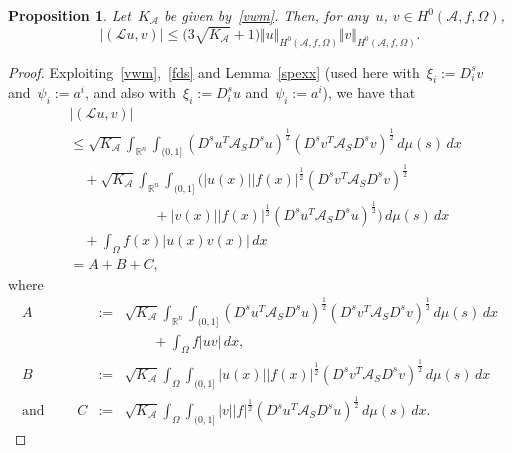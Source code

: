 \documentclass[11pt,hyp,]{nyjm}
\numberwithin{equation}{section}
\newcommand{\R}{\mathbb{R}}
\newtheorem{proposition}[theorem]{Proposition}
\theoremstyle{remark}
\newcommand{\ml}{\mathcal{L}}
\newcommand{\am}{\mathcal{A}}
\renewcommand{\leq}{\leqslant}
\begin{document}
			\begin{proposition}\label{ghighi}
				Let~$K_{\am}$ be given by~\eqref{vwm}. Then, for any~$u$, $v \in H^0(\mathcal{A}, f, \Omega)$,
				\[|(\ml u, v ) | \leq \big(3 \sqrt{K_{\am}}+1\big) \Vert u \Vert_{H^0(\mathcal{A}, f, \Omega)} \Vert v \Vert_{H^0(\mathcal{A}, f, \Omega)}.\]        
			\end{proposition}

			\begin{proof}
Exploiting~\eqref{vwm},~\eqref{fds} and Lemma~\ref{spexx}
(used here with~$\xi_i:=D^s_i v$ and~$\psi_i:=a^i$, and also with~$\xi_i:=D^s_i u$ and~$\psi_i:=a^i$), we have that
				\begin{align*}&
					|(\ml u, v)| \\&\leq \sqrt{K_{\am}} \int_{\R^n} \int_{(0,1]} (D^su^T \mathcal{A}_S D^su)^{\frac{1}{2}} (D^sv^T \mathcal{A}_S D^sv)^{\frac{1}{2}} \, d\mu(s) \, dx \\ &\quad + \sqrt{K_{\am} }\int_{\R^n} \int_{(0,1]}\Big(
|u(x)| |f(x)|^{\frac{1}{2}} (D^sv^T \mathcal{A}_S D^sv)^{\frac{1}{2}} \\&\qquad\qquad\qquad+ |v(x)| |f(x)|^{\frac{1}{2}} (D^su^T \mathcal{A}_S D^su)^{\frac{1}{2}} \Big)\, d\mu(s) \, dx \\ &\quad +  \int_{\Omega}f(x) |u(x) v(x)| \, dx \\ &=A + B + C,
\end{align*}	
where
\begin{eqnarray*}
A&:=& \sqrt{K_{\am}}  \displaystyle\int_{\R^n}
\int_{(0,1]} (D^su^T \mathcal{A}_S D^su)^{\frac{1}{2}} (D^sv^T \mathcal{A}_S D^sv)^{\frac{1}{2}} \, d\mu(s) \, dx \\&&\qquad+ \int_{\Omega}f |u v| \, dx  ,\\
B&:=&\sqrt{ K_{\am} }\displaystyle\int_{\Omega} \int_{(0,1]} |u(x)| |f(x)|^{\frac{1}{2}} (D^sv^T \mathcal{A}_S D^sv)^{\frac{1}{2}} \, d\mu(s) \, dx \\ 
{\mbox{and }}\qquad C&:=& \sqrt{K_{\am}} \displaystyle\int_{\Omega} \int_{(0,1]} |v| |f|^{\frac{1}{2}} (D^su^T \mathcal{A}_S D^su)^{\frac{1}{2}} \, d\mu (s)\, dx.
\end{eqnarray*}


\end{proof}
\end{document}
